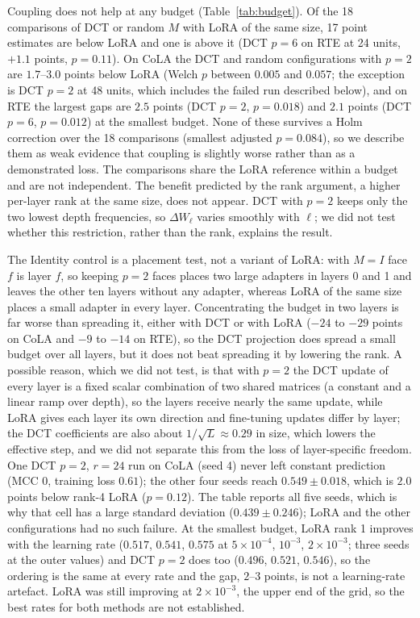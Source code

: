 \documentclass{article}
\theoremstyle{plain}
\begin{document}
Coupling does not help at any budget (Table~\ref{tab:budget}).
Of the 18 comparisons of DCT or random $M$ with LoRA of the same size, 17 point estimates are below LoRA and one is above it (DCT $p=6$ on RTE at 24 units, $+1.1$ points, $p=0.11$).
On CoLA the DCT and random configurations with $p=2$ are $1.7$--$3.0$ points below LoRA (Welch $p$ between $0.005$ and $0.057$; the exception is DCT $p=2$ at 48 units, which includes the failed run described below), and on RTE the largest gaps are $2.5$ points (DCT $p=2$, $p=0.018$) and $2.1$ points (DCT $p=6$, $p=0.012$) at the smallest budget.
None of these survives a Holm correction over the 18 comparisons (smallest adjusted $p=0.084$), so we describe them as weak evidence that coupling is slightly worse rather than as a demonstrated loss.
The comparisons share the LoRA reference within a budget and are not independent.
The benefit predicted by the rank argument, a higher per-layer rank at the same size, does not appear.
DCT with $p=2$ keeps only the two lowest depth frequencies, so $\Delta W_\ell$ varies smoothly with $\ell$; we did not test whether this restriction, rather than the rank, explains the result.

The Identity control is a placement test, not a variant of LoRA: with $M=I$ face $f$ is layer $f$, so keeping $p=2$ faces places two large adapters in layers 0 and 1 and leaves the other ten layers without any adapter, whereas LoRA of the same size places a small adapter in every layer.
Concentrating the budget in two layers is far worse than spreading it, either with DCT or with LoRA ($-24$ to $-29$ points on CoLA and $-9$ to $-14$ on RTE), so the DCT projection does spread a small budget over all layers, but it does not beat spreading it by lowering the rank.
A possible reason, which we did not test, is that with $p=2$ the DCT update of every layer is a fixed scalar combination of two shared matrices (a constant and a linear ramp over depth), so the layers receive nearly the same update, while LoRA gives each layer its own direction and fine-tuning updates differ by layer; the DCT coefficients are also about $1/\sqrt{L}\approx0.29$ in size, which lowers the effective step, and we did not separate this from the loss of layer-specific freedom.
One DCT $p=2$, $r=24$ run on CoLA (seed 4) never left constant prediction (MCC $0$, training loss $0.61$); the other four seeds reach $0.549\pm0.018$, which is $2.0$ points below rank-4 LoRA ($p=0.12$).
The table reports all five seeds, which is why that cell has a large standard deviation ($0.439\pm0.246$); LoRA and the other configurations had no such failure.
At the smallest budget, LoRA rank 1 improves with the learning rate ($0.517$, $0.541$, $0.575$ at $5\times10^{-4}$, $10^{-3}$, $2\times10^{-3}$; three seeds at the outer values) and DCT $p=2$ does too ($0.496$, $0.521$, $0.546$), so the ordering is the same at every rate and the gap, $2$--$3$ points, is not a learning-rate artefact.
LoRA was still improving at $2\times10^{-3}$, the upper end of the grid, so the best rates for both methods are not established.
\end{document}

